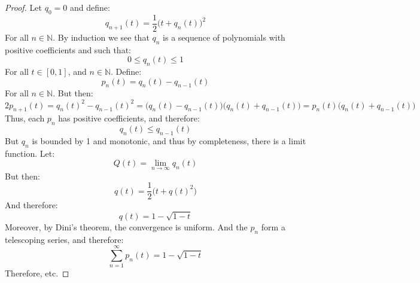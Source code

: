 \documentclass[crop=false,class=book,oneside]{standalone}                      %
\begin{document}
        \begin{proof}
            Let $q_{0}=0$ and define:
            \begin{equation}
                q_{n+1}(t)=\frac{1}{2}\big(t+q_{n}(t)\big)^{2}
            \end{equation}
            For all $n\in\mathbb{N}$. By induction we see that
            $q_{n}$ is a sequence of polynomials with positive
            coefficients and such that:
            \begin{equation}
                0\leq{q}_{n}(t)\leq{1}
            \end{equation}
            For all $t\in[0,1]$, and $n\in\mathbb{N}$. Define:
            \begin{equation}
                p_{n}(t)=q_{n}(t)-q_{n-1}(t)
            \end{equation}
            For all $n\in\mathbb{N}$. But then:
            \begin{equation}
                2p_{n+1}(t)
                =q_{n}(t)^{2}-q_{n-1}(t)^{2}
                =\big(q_{n}(t)-q_{n-1}(t)\big)
                    \big(q_{n}(t)+q_{n-1}(t)\big)
                =p_{n}(t)\big(q_{n}(t)+q_{n-1}(t)\big)
            \end{equation}
            Thus, each $p_{n}$ has positive coefficients, and
            therefore:
            \begin{equation}
                q_{n}(t)\leq{q}_{n-1}(t)
            \end{equation}
            But $q_{n}$ is bounded by 1 and monotonic, and thus
            by completeness, there is a limit function. Let:
            \begin{equation}
                Q(t)=\underset{n\rightarrow\infty}{\lim}q_{n}(t)
            \end{equation}
            But then:
            \begin{equation}
                q(t)=\frac{1}{2}\big(t+q(t)^{2}\big)
            \end{equation}
            And therefore:
            \begin{equation}
                q(t)=1-\sqrt{1-t}
            \end{equation}
            Moreover, by Dini's theorem, the convergence is
            uniform. And the $p_{n}$ form a telescoping series,
            and therefore:
            \begin{equation}
                \sum_{n=1}^{\infty}p_{n}(t)=1-\sqrt{1-t}
            \end{equation}
            Therefore, etc.
        \end{proof}
\end{document}
